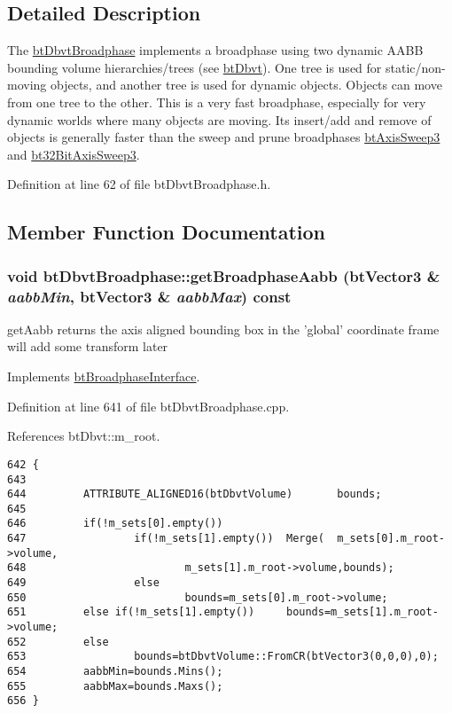 \subsection{Detailed Description}
The \hyperlink{structbt_dbvt_broadphase}{btDbvtBroadphase} implements a broadphase using two dynamic AABB bounding volume hierarchies/trees (see \hyperlink{structbt_dbvt}{btDbvt}). One tree is used for static/non-moving objects, and another tree is used for dynamic objects. Objects can move from one tree to the other. This is a very fast broadphase, especially for very dynamic worlds where many objects are moving. Its insert/add and remove of objects is generally faster than the sweep and prune broadphases \hyperlink{classbt_axis_sweep3}{btAxisSweep3} and \hyperlink{classbt32_bit_axis_sweep3}{bt32BitAxisSweep3}. 

Definition at line 62 of file btDbvtBroadphase.h.

\subsection{Member Function Documentation}
\hypertarget{structbt_dbvt_broadphase_32ab55b5ef2616d0cc039cd037c05d7f}{
\subsubsection[getBroadphaseAabb]{\setlength{\rightskip}{0pt plus 5cm}void btDbvtBroadphase::getBroadphaseAabb (btVector3 \& {\em aabbMin}, \/  btVector3 \& {\em aabbMax}) const}}
\label{structbt_dbvt_broadphase_32ab55b5ef2616d0cc039cd037c05d7f}


getAabb returns the axis aligned bounding box in the 'global' coordinate frame will add some transform later 

Implements \hyperlink{classbt_broadphase_interface_b5af9e26414f5a72a76040b8fab4d9e2}{btBroadphaseInterface}.

Definition at line 641 of file btDbvtBroadphase.cpp.

References btDbvt::m\_\-root.

\begin{Code}\begin{verbatim}642 {
643 
644         ATTRIBUTE_ALIGNED16(btDbvtVolume)       bounds;
645 
646         if(!m_sets[0].empty())
647                 if(!m_sets[1].empty())  Merge(  m_sets[0].m_root->volume,
648                         m_sets[1].m_root->volume,bounds);
649                 else
650                         bounds=m_sets[0].m_root->volume;
651         else if(!m_sets[1].empty())     bounds=m_sets[1].m_root->volume;
652         else
653                 bounds=btDbvtVolume::FromCR(btVector3(0,0,0),0);
654         aabbMin=bounds.Mins();
655         aabbMax=bounds.Maxs();
656 }
\end{verbatim}
\end{Code}


